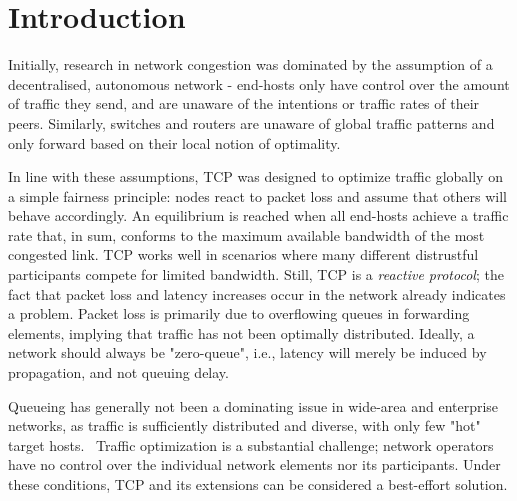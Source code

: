 \section{Introduction}
\label{sec:intro}
Initially, research in network congestion was dominated by the assumption of a decentralised, autonomous network - end-hosts only have control over the amount of traffic they send, and are unaware of the intentions or traffic rates of their peers. Similarly, switches and routers are unaware of global traffic patterns and only forward based on their local notion of optimality.

In line with these assumptions, TCP was designed to optimize traffic globally on a simple fairness principle: nodes react to packet loss and assume that others will behave accordingly. An equilibrium is reached when all end-hosts achieve a traffic rate that, in sum, conforms to the maximum available bandwidth of the most congested link.
TCP works well  in scenarios where many different distrustful participants compete for limited bandwidth. Still, TCP is a \textit{reactive protocol}; the fact that packet loss and latency increases occur in the network already indicates a problem. Packet loss is primarily due to overflowing queues in forwarding elements, implying that traffic has not been optimally distributed. Ideally, a network should always be "zero-queue", i.e., latency will merely be induced by propagation, and not queuing delay. 

Queueing has generally not been a dominating issue in wide-area and enterprise networks, as traffic is sufficiently distributed and diverse, with only few "hot" target hosts.~\cite{hedera, microte} Traffic optimization is a substantial challenge; network operators have no control over the individual network elements nor its participants. Under these conditions, TCP and its extensions can be considered a best-effort solution.


